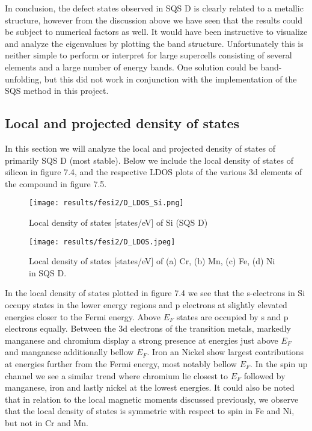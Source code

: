 In conclusion, the defect states observed in SQS D is clearly related to a metallic structure, however from the discussion above we have seen that the results could be subject to numerical factors as well. It would have been instructive to visualize and analyze the eigenvalues by plotting the band structure. Unfortunately this is neither simple to perform or interpret for large supercells consisting of several elements and a large number of energy bands. One solution could be band-unfolding, but this did not work in conjunction with the implementation of the SQS method in this project. 


\newpage
\subsection{Local and projected density of states}
In this section we will analyze the local and projected density of states of primarily SQS D (most stable). Below we include the local density of states of silicon in figure 7.4, and the respective LDOS plots of the various 3d elements of the compound in figure 7.5.  
  
\begin{figure}[H]
	\centering
	\texttt{[image: results/fesi2/D\_LDOS\_Si.png]}
	\caption{Local density of states [states/eV] of Si (SQS D)}
\end{figure} 

\begin{figure}[H]
	\centering
	\texttt{[image: results/fesi2/D\_LDOS.jpeg]}
	\caption{Local density of states [states/eV] of (a) Cr, (b) Mn, (c) Fe, (d) Ni in SQS D.}
\end{figure}   
  
In the local density of states plotted in figure 7.4 we see that the s-electrons in Si occupy states in the lower energy regions and p electrons at slightly elevated energies closer to the Fermi energy. Above $E_F$ states are occupied by s and p electrons equally. Between the 3d electrons of the transition metals, markedly manganese and chromium display a strong presence at energies just above $E_F$ and manganese additionally bellow $E_F$. Iron an Nickel show largest contributions at energies further from the Fermi energy, most notably bellow $E_F$. In the spin up channel we see a similar trend where chromium lie closest to $E_F$ followed by manganese, iron and lastly nickel at the lowest energies. It could also be noted that in relation to the local magnetic moments discussed previously, we observe that the local density of states is symmetric with respect to spin in Fe and Ni, but not in Cr and Mn. 

